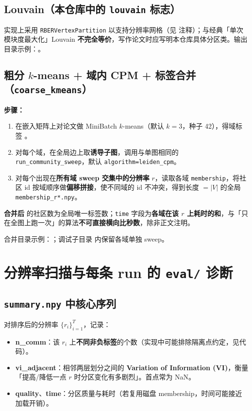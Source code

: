 \documentclass[UTF8,a4paper,11pt,fontset=fandol]{ctexart}
\begin{document}
\subsection{Louvain（本仓库中的 \texttt{louvain} 标志）}
实现上采用 \texttt{RBERVertexPartition} 以支持分辨率网格（见  注释）；与经典「单次模块度最大化」Louvain \textbf{不完全等价}，写作论文时应写明本仓库具体分区类。输出目录示例：。

\subsection{粗分 $k$-means + 域内 CPM + 标签合并（\texttt{coarse\_kmeans}）}
\textbf{步骤：}
\begin{enumerate}
  \item 在嵌入矩阵上对论文做 MiniBatch $k$-means（默认 $k{=}3$，种子 42），得域标签 。
  \item 对每个域，在全局边上取\textbf{诱导子图}，调用与单图相同的 \texttt{run\_community\_sweep}，默认 \texttt{algorithm=leiden\_cpm}。
  \item 对每个出现在\textbf{所有域 sweep 交集中的分辨率} $r$，读取各域 \texttt{membership}，将社区 id 按域顺序做\textbf{偏移拼接}，使不同域的 id 不冲突，得到长度 $=|V|$ 的全局 \texttt{membership\_r*.npy}。
\end{enumerate}

\textbf{合并后 } 的社区数为全局唯一标签数；\texttt{time} 字段为\textbf{各域在该 $r$ 上耗时的和}，与「只在全图上跑一次」的算法\textbf{不可直接横向比秒数}，除非正文注明。

合并目录示例：；调试子目录  内保留各域单独 sweep。

\section{分辨率扫描与每条 run 的 \texttt{eval/} 诊断}

\subsection{\texttt{summary.npy} 中核心序列}
对排序后的分辨率 $\{r_i\}_{i=1}^T$，记录：
\begin{itemize}
  \item \textbf{n\_comm}：该 $r_i$ 上\textbf{不同非负标签}的个数（实现中可能排除隔离点约定，见代码）。
  \item \textbf{vi\_adjacent}：相邻两层划分之间的 \textbf{Variation of Information (VI)}，衡量「提高/降低一点 $r$ 时分区变化有多剧烈」。首点常为 NaN。
  \item \textbf{quality}、\textbf{time}：分区质量与耗时（若复用磁盘 membership，时间可能接近加载开销）。
\end{itemize}
\end{document}
